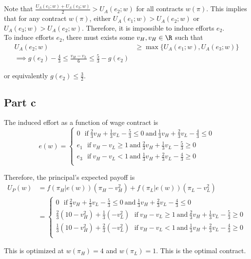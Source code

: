 Note that $\frac{U_A(e_1; w) + U_A(e_3; w)}{2} > U_A(e_2; w)$ for all contracts $w(\pi)$. This implies that for any contract $w(\pi)$, either $U_A(e_1; w) > U_A(e_2; w)$ or $U_A(e_3; w) > U_A(e_2; w)$. Therefore, it is impossible to induce efforts $e_2$.\\

To induce efforts $e_2$, there must exists some $v_H, v_H \in \R$ such that 
\begin{align*}
    U_A(e_2; w) &\ge \max\{U_A(e_1; w), U_A(e_3; w)\}\\
    \implies g(e_2)-\frac{4}{3} \le \frac{v_H - v_L}{6} \le \frac{5}{3} - g(e_2)
\end{align*}

or equivalently $g(e_2) \le \frac{3}{2}$.

\subsection*{Part c}
The induced effort as a function of wage contract is 
$$e(w)  =\begin{cases}
    0 ~~~ \text{if}~ \frac{2}{3}v_H + \frac{1}{3}v_L - \frac{5}{3} \le 0 ~\text{and}~\frac{1}{3}v_H + \frac{2}{3}v_L - \frac{4}{3} \le 0 \\
    e_1~~~\text{if}~v_H - v_L \ge 1 ~\text{and}~ \frac{2}{3}v_H + \frac{1}{3}v_L - \frac{5}{3} \ge 0\\
    e_3~~~\text{if}~v_H - v_L < 1 ~\text{and}~\frac{1}{3}v_H + \frac{2}{3}v_L - \frac{4}{3} \ge 0\\
\end{cases}$$

Therefore, the principal's expected payoff is 
\begin{align*}
    U_P(w) &= f(\pi_H|e(w))(\pi_H - v_H^2) + f(\pi_L|e(w))(\pi_L - v_L^2)\\
    &= \begin{cases}
        0 ~~~ \text{if}~ \frac{2}{3}v_H + \frac{1}{3}v_L - \frac{5}{3} \le 0 ~\text{and}~\frac{1}{3}v_H + \frac{2}{3}v_L - \frac{4}{3} \le 0 \\
        \frac{2}{3}(10-v_H^2) + \frac{1}{3}(-v_L^2)~~~\text{if}~v_H - v_L \ge 1 ~\text{and}~ \frac{2}{3}v_H + \frac{1}{3}v_L - \frac{5}{3} \ge 0\\
        \frac{1}{3}(10-v_H^2) + \frac{2}{3}(-v_L^2)~~~\text{if}~v_H - v_L < 1 ~\text{and}~\frac{1}{3}v_H + \frac{2}{3}v_L - \frac{4}{3} \ge 0\\
    \end{cases}
\end{align*}

This is optimized at $w(\pi_H) = 4$ and $w(\pi_L) = 1$. This is the optimal contract.